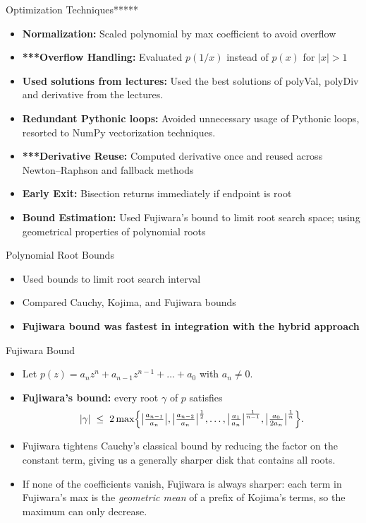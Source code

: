 \documentclass{beamer}
\begin{document}
\begin{frame}{Optimization Techniques*****}
\begin{itemize}
    \item \textbf{Normalization:} Scaled polynomial by max coefficient to avoid overflow
    \item \textbf{***Overflow Handling:} Evaluated $p(1/x)$ instead of $p(x)$ for $|x| > 1$
    \item \textbf{Used solutions from lectures:} Used the best solutions of polyVal, polyDiv and derivative from the lectures.
    \item \textbf{Redundant Pythonic loops:} Avoided unnecessary usage of Pythonic loops, resorted to NumPy vectorization techniques.
    \item \textbf{***Derivative Reuse:} Computed derivative once and reused across Newton–Raphson and fallback methods
    \item \textbf{Early Exit:} Bisection returns immediately if endpoint is root
    \item \textbf{Bound Estimation:} Used Fujiwara's bound to limit root search space; using geometrical properties of polynomial roots
\end{itemize}
\end{frame}


\begin{frame}{Polynomial Root Bounds}
\begin{itemize}
    \item Used bounds to limit root search interval
    \item Compared Cauchy, Kojima, and Fujiwara bounds
    \item \textbf{Fujiwara bound was fastest in integration with the hybrid approach}
\end{itemize}
\end{frame}

\begin{frame}{Fujiwara Bound}
\begin{itemize}
  \item Let $p(z)=a_n z^n + a_{n-1} z^{n-1} + \dots + a_0$ with $a_n\neq 0$.
  \item \textbf{Fujiwara’s bound:} every root $\gamma$ of $p$ satisfies
        \[
          |\gamma|\;\le\;
          2\max\Bigl\{
          \bigl|\tfrac{a_{n-1}}{a_n}\bigr|,
          \bigl|\tfrac{a_{n-2}}{a_n}\bigr|^{\frac12},
          \dots,
          \bigl|\tfrac{a_{1}}{a_n}\bigr|^{\frac1{n-1}},
          \bigl|\tfrac{a_{0}}{2a_n}\bigr|^{\frac1n}
          \Bigr\}.
        \]

  \item Fujiwara tightens Cauchy’s classical bound by reducing the factor on the constant term, giving us a generally sharper disk that contains all roots.
  \item If none of the coefficients vanish, Fujiwara is always sharper: each term in Fujiwara’s max is the \emph{geometric mean} of a prefix of Kojima’s terms, so the maximum can only decrease.
\end{itemize}
\end{frame}
\end{document}
